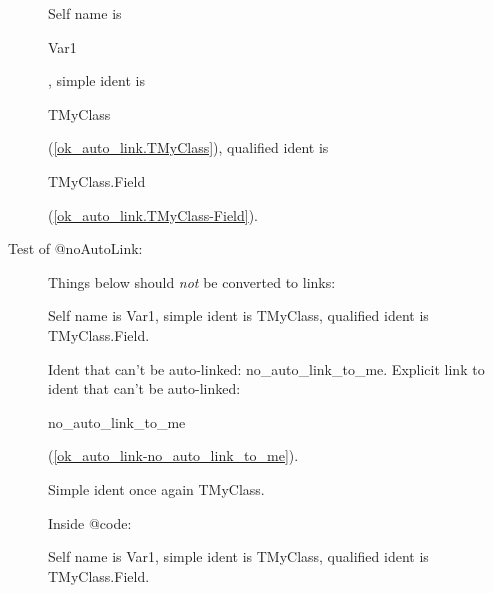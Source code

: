 \documentclass{report}
\begin{document}
\begin{list}{}
\begin{description}
\begin{ttfamily} Self name is \begin{ttfamily}Var1\end{ttfamily}, simple ident is \begin{ttfamily}TMyClass\end{ttfamily}(\ref{ok_auto_link.TMyClass}), qualified ident is \begin{ttfamily}TMyClass.Field\end{ttfamily}(\ref{ok_auto_link.TMyClass-Field}). \end{ttfamily} 
\item[Test of @noAutoLink:]  Things below should \textit{not} be converted to links:

 Self name is Var1, simple ident is TMyClass, qualified ident is TMyClass.Field.

Ident that can't be auto{-}linked: no{\_}auto{\_}link{\_}to{\_}me. Explicit link to ident that can't be auto{-}linked: \begin{ttfamily}no{\_}auto{\_}link{\_}to{\_}me\end{ttfamily}(\ref{ok_auto_link-no_auto_link_to_me}).

Simple ident once again TMyClass.

Inside @code:

\begin{ttfamily} Self name is Var1, simple ident is TMyClass, qualified ident is TMyClass.Field.\end{ttfamily}  
\end{description}

\end{list}
\end{document}
